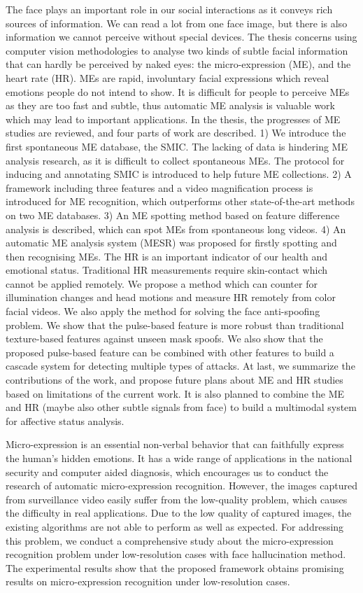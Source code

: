 The face plays an important role in our social interactions as it conveys rich sources of information. We can read a lot from one face image, but there is also information we cannot perceive without special devices. The thesis concerns using computer vision methodologies to analyse two kinds of subtle facial information that can hardly be perceived by naked eyes: the micro-expression (ME), and the heart rate (HR). 
MEs are rapid, involuntary facial expressions which reveal emotions people do not intend to show. It is difficult for people to perceive MEs as they are too fast and subtle, thus automatic ME analysis is valuable work which may lead to important applications. In the thesis, the progresses of ME studies are reviewed, and four parts of work are described. 1) We introduce the first spontaneous ME database, the SMIC. The lacking of data is hindering ME analysis research, as it is difficult to collect spontaneous MEs. The protocol for inducing and annotating SMIC is introduced to help future ME collections. 2) A framework including three features and a video magnification process is introduced for ME recognition, which outperforms other state-of-the-art methods on two ME databases. 3) An ME spotting method based on feature difference analysis is described, which can spot MEs from spontaneous long videos. 4) An automatic ME analysis system (MESR) was proposed for firstly spotting and then recognising MEs.
The HR is an important indicator of our health and emotional status. Traditional HR measurements require skin-contact which cannot be applied remotely. We propose a method which can counter for illumination changes and head motions and measure HR remotely from color facial videos. We also apply the method for solving the face anti-spoofing problem. We show that the pulse-based feature is more robust than traditional texture-based features against unseen mask spoofs. We also show that the proposed pulse-based feature can be combined with other features to build a cascade system for detecting multiple types of attacks.
At last, we summarize the contributions of the work, and propose future plans about ME and HR studies based on limitations of the current work. It is also planned to combine the ME and HR (maybe also other subtle signals from face) to build a multimodal system for affective status analysis.

Micro-expression is an essential non-verbal behavior that can faithfully express the human's hidden emotions. It has a wide range of applications in the national security and computer aided diagnosis, which encourages us to conduct the research of automatic micro-expression recognition. However, the images captured from surveillance video easily suffer from the low-quality problem, which causes the difficulty in real applications. Due to the low quality of captured images, the existing algorithms are not able to perform as well as expected. For addressing this problem, we conduct a comprehensive study about the micro-expression recognition problem under low-resolution cases with face hallucination method. The experimental results show that the proposed framework obtains promising results on micro-expression recognition under low-resolution cases.


